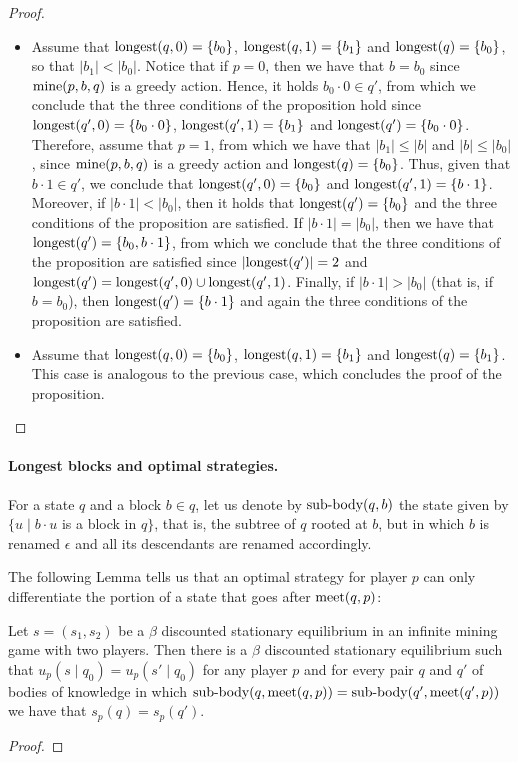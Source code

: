 \begin{proof}
\begin{itemize}
\item Assume that ${\text{\rm longest}}(q,0) = \{b_0\}$,  ${\text{\rm longest}}(q, 1) = \{b_1\}$ and ${\text{\rm longest}}(q) = \{b_0\}$, so that $|b_1| < |b_0|$. Notice that if $p =0$, then we have that $b=b_0$ since $\text{\rm mine}(p,b,q)$ is a greedy action. Hence, it holds $b_0 \cdot 0 \in q'$, from which we conclude that the three conditions of the proposition hold since ${\text{\rm longest}}(q',0) = \{b_0 \cdot 0\}$, ${\text{\rm longest}}(q',1) = \{b_1\}$ and ${\text{\rm longest}}(q') = \{b_0 \cdot 0\}$. Therefore, assume that $p = 1$, from which we have that  $|b_1| \leq |b|$ and $|b| \leq |b_0|$, since $\text{\rm mine}(p,b,q)$ is a greedy action and ${\text{\rm longest}}(q) = \{b_0\}$. Thus, given that $b \cdot 1 \in q'$, we conclude that ${\text{\rm longest}}(q',0) = \{b_0\}$ and ${\text{\rm longest}}(q',1) = \{b \cdot 1\}$. 
Moreover, if $|b \cdot 1| < |b_0|$, then it holds that ${\text{\rm longest}}(q') = \{b_0\}$ and the three conditions of the proposition are satisfied. If $|b \cdot 1| = |b_0|$, then we have that ${\text{\rm longest}}(q') = \{b_0, b \cdot 1\}$, from which we conclude that the three conditions of the proposition are satisfied since $|{\text{\rm longest}}(q')| = 2$ and ${\text{\rm longest}}(q') = {\text{\rm longest}}(q',0) \cup {\text{\rm longest}}(q',1)$. Finally, if $|b \cdot 1| > |b_0|$ (that is, if $b = b_0$), then ${\text{\rm longest}}(q') = \{b \cdot 1\}$ and again the three conditions of the proposition are satisfied.

\item Assume that ${\text{\rm longest}}(q,0) = \{b_0\}$,  ${\text{\rm longest}}(q, 1) = \{b_1\}$ and ${\text{\rm longest}}(q) = \{b_1\}$. This case is analogous to the previous case, which concludes the proof of the proposition.
\end{itemize}
\end{proof}


\paragraph{Longest blocks and optimal strategies.}
For a state $q$ and a block $b \in q$, let us denote by ${\text{\rm sub-body}}(q,b)$ the state
given by $\{u \mid b\cdot u$ is a block in $q\}$, that is, the subtree of $q$ rooted at $b$, but in which $b$ is renamed 
$\epsilon$ and all its descendants are renamed accordingly. 


The following Lemma tells us that an optimal strategy for player $p$ can only differentiate the portion of 
a state that goes after $\text{\rm meet}(q,p)$: 

\begin{mylem}\label{lem-optimal}
Let $s = (s_1,s_2)$ be a $\beta$ discounted stationary equilibrium in an infinite mining game with two players. 
Then there is a $\beta$ discounted stationary equilibrium such that $u_p(s \mid q_0) = u_p(s' \mid q_0)$ for 
any player $p$ and for every pair $q$ and $q'$ of 
bodies of knowledge in which ${\text{\rm sub-body}}(q,\text{\rm meet}(q,p)) = {\text{\rm sub-body}}(q',\text{\rm meet}(q',p))$ we have that 
$s_p(q) = s_p(q')$. 
\end{mylem}

\begin{proof}
\end{proof}